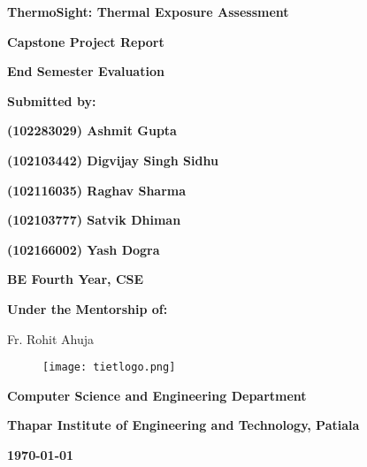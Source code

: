 \begin{titlepage}
    \centering
    {\Huge\bfseries ThermoSight: Thermal Exposure Assessment \par}

    \vspace{1cm}
    {\Large\bfseries Capstone Project Report \par}
    {\Large\bfseries End Semester Evaluation \par}

    \vspace{1cm}
    {\large\bfseries Submitted by: \par}
    {\large\bfseries (102283029) Ashmit Gupta \par}
    {\large\bfseries (102103442) Digvijay Singh Sidhu \par}
    {\large\bfseries (102116035) Raghav Sharma \par}
    {\large\bfseries (102103777) Satvik Dhiman \par}
    {\large\bfseries (102166002) Yash Dogra \par}

    \vspace{0.25cm}
    {\large\bfseries BE Fourth Year, CSE \par}

    \vspace{1cm}
    {\large\bfseries Under the Mentorship of: \par}
    {\large Fr. Rohit Ahuja \par}

    \vspace{0.5cm}
    \begin{figure}[h!]
        \centering
        \texttt{[image: tietlogo.png]}
    \end{figure}

    \vspace{0.5cm}
    {\large\bfseries Computer Science and Engineering Department \par}
    {\large\bfseries Thapar Institute of Engineering and Technology, Patiala \par}
    {\large\bfseries \today \par}
\end{titlepage}
